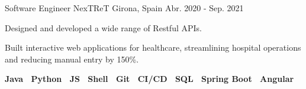 \begin{cventries}
      \cventry
      {Software Engineer} %
      {NexTReT} %
      {Girona, Spain} %
      {Abr. 2020 - Sep. 2021} %
      {
        \begin{cvitems}
        \item {Designed and developed a wide range of Restful APIs.}
        \item {Built interactive web applications for healthcare, streamlining hospital operations and reducing manual entry by 150\%.}
        \item {
          \textbf{
            Java \textbar \
            Python \textbar \
            JS \textbar \
            Shell \textbar \
            Git \textbar \
            CI/CD \textbar \
            SQL \textbar \
            Spring Boot \textbar \
            Angular
         }
        }
        \end{cvitems}
      }

  \end{cventries}
